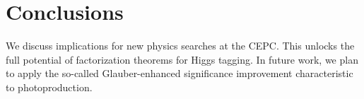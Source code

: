 \section{Conclusions}\label{sec:conclusions}

We discuss implications for new physics searches at the CEPC. This
unlocks the full potential of factorization theorems for Higgs tagging.
In future work, we plan to apply the so-called Glauber-enhanced
significance improvement characteristic to photoproduction.

